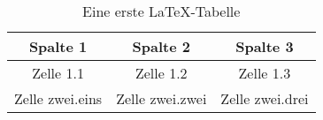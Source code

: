 
\begin{table}[h!]
\begin{center}
\begin{tabular}{|c|c|c|}
\hline
Spalte 1         &     Spalte 2           &     Spalte 3             \\
\hline
Zelle 1.1        &     Zelle 1.2          &     Zelle 1.3            \\
\hline
Zelle zwei.eins  &     Zelle zwei.zwei    &     Zelle zwei.drei      \\
\hline
\end{tabular}
\caption{Eine erste LaTeX-Tabelle}
\end{center}
\end{table}

